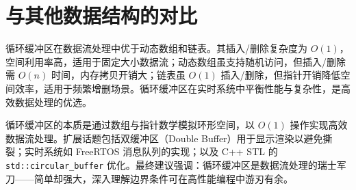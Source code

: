 \chapter{与其他数据结构的对比}
循环缓冲区在数据流处理中优于动态数组和链表。其插入/删除复杂度为 $O(1)$，空间利用率高，适用于固定大小数据流；动态数组虽支持随机访问，但插入/删除需 $O(n)$ 时间，内存拷贝开销大；链表虽 $O(1)$ 插入/删除，但指针开销降低空间效率，适用于频繁增删场景。循环缓冲区在实时系统中平衡性能与复杂性，是高效数据处理的优选。\par
循环缓冲区的本质是通过数组与指针数学模拟环形空间，以 $O(1)$ 操作实现高效数据流处理。扩展话题包括双缓冲区（Double Buffer）用于显示渲染以避免撕裂；实时系统如 FreeRTOS 消息队列的实现；以及 C++ STL 的 \texttt{std::circular\_{}buffer} 优化。最终建议强调：循环缓冲区是数据流处理的瑞士军刀——简单却强大，深入理解边界条件可在高性能编程中游刃有余。\par
